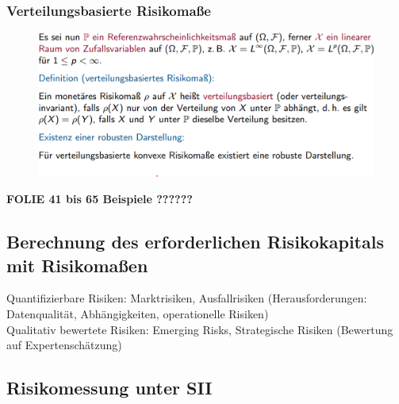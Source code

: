 \documentclass[12pt]{report}
\theoremstyle{dotless}
\theoremstyle{definition}
\begin{document}
\subsubsection{Verteilungsbasierte Risikomaße}

\begin{figure}[ht]
	\centering
	\includegraphics[width=0.9 \textwidth]{Bilder/verteilungsbasiert.png}
\end{figure}


\textbf{FOLIE 41 bis 65 Beispiele ??????}


\subsection{Berechnung des erforderlichen Risikokapitals mit Risikomaßen}

Quantifizierbare Risiken: Marktrisiken, Ausfallrisiken (Herausforderungen: Datenqualität, Abhängigkeiten, operationelle Risiken) \\
Qualitativ bewertete Risiken: Emerging Risks, Strategische Risiken (Bewertung auf Expertenschätzung)

\subsection{Risikomessung unter SII}
\end{document}
